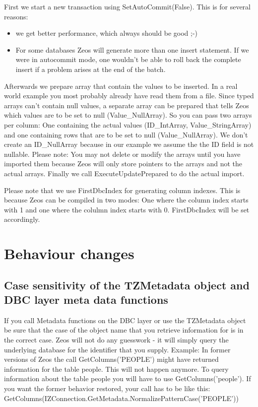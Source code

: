 \documentclass[a4paper,12pt,oneside]{book}
\begin{document}
First we start a new transaction using SetAutoCommit(False).
This is for several reasons:
\begin{itemize}
\item we get better performance, which always should be good ;-)
\item
  For some databases Zeos will generate more than one insert statement.
  If we were in autocommit mode, one wouldn't be able to roll back the complete insert if a problem arises at the end of the batch.
\end{itemize}
Afterwards we prepare array that contain the values to be inserted.
In a real world example you most probably already have read them from a file.
Since typed arrays can't contain null values, a separate array can be prepared that tells Zeos which values are to be set to null (Value\_NullArray).
So you can pass two arrays per column: 
One containing the actual values (ID\_IntArray, Value\_StringArray) and one containing rows that are to be set to null (Value\_NullArray).
We don't create an ID\_NullArray because in our example we assume the the ID field is not nullable.
Please note:
You may not delete or modify the arrays until you have imported them because Zeos will only store pointers to the arrays and not the actual arrays.
Finally we call ExecuteUpdatePrepared to do the actual import.

Please note that we use FirstDbcIndex for generating column indexes.
This is because Zeos can be compiled in two modes: 
One where the column index starts with 1 and one where the colulmn index starts with 0. 
FirstDbcIndex will be set accordingly.

\section{Behaviour changes}
\label{sec:Rev4_BreakingChanges}
\subsection{Case sensitivity of the TZMetadata object and DBC layer meta data functions}
\label{sec:Rev4_BreakingChanges_MetadataCaseSensitivity}
If you call Metadata functions on the DBC layer or use the TZMetadata object be sure that the case of the object name that you retrieve information for is in the correct case.
Zeos will not do any guesswork - it will simply query the underlying database for the identifier that you supply.
Example: In former versions of Zeos the call GetColumns('PEOPLE') might have returned information for the table people.
This will not happen anymore.
To query information about the table people you will have to use GetColumns('people').
If you want the former behavior restored, your call has to be like this:\\
GetColumns(\-IZConnection.\-GetMetadata.\-NormalizePatternCase('PEOPLE'))
\end{document}
